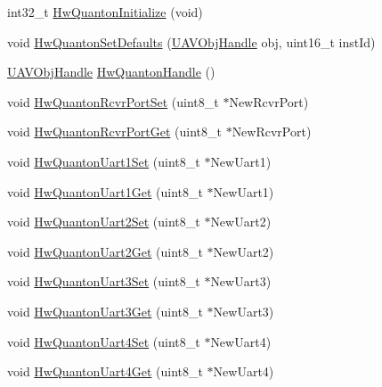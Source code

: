 \begin{DoxyCompactItemize}
\item 
int32\-\_\-t \hyperlink{group___hw_quanton_gae2df9822c9e4dc6b9ff0a0279c1b752c}{\-Hw\-Quanton\-Initialize} (void)
\item 
void \hyperlink{group___hw_quanton_ga95a69075563fcfd70b1cc3efbd8539c3}{\-Hw\-Quanton\-Set\-Defaults} (\hyperlink{targets_2_u_a_v_objects_2inc_2uavobjectmanager_8h_a279053e22be53ce9f895043aaeb91e3b}{\-U\-A\-V\-Obj\-Handle} obj, uint16\-\_\-t inst\-Id)
\item 
\hyperlink{targets_2_u_a_v_objects_2inc_2uavobjectmanager_8h_a279053e22be53ce9f895043aaeb91e3b}{\-U\-A\-V\-Obj\-Handle} \hyperlink{group___hw_quanton_ga00ae70f945e2fa2fc4e6a6668b62e39c}{\-Hw\-Quanton\-Handle} ()
\item 
void \hyperlink{group___hw_quanton_gab4fe0384660d8d039ed3e371b6895635}{\-Hw\-Quanton\-Rcvr\-Port\-Set} (uint8\-\_\-t $\ast$\-New\-Rcvr\-Port)
\item 
void \hyperlink{group___hw_quanton_gab22730ad4f488960df2bd2301b038a0e}{\-Hw\-Quanton\-Rcvr\-Port\-Get} (uint8\-\_\-t $\ast$\-New\-Rcvr\-Port)
\item 
void \hyperlink{group___hw_quanton_gafe02655e076c9d34e8db01edcd1fc32f}{\-Hw\-Quanton\-Uart1\-Set} (uint8\-\_\-t $\ast$\-New\-Uart1)
\item 
void \hyperlink{group___hw_quanton_ga3249f49fdc06c794f297320d9c01d3ef}{\-Hw\-Quanton\-Uart1\-Get} (uint8\-\_\-t $\ast$\-New\-Uart1)
\item 
void \hyperlink{group___hw_quanton_ga404b283aaa5abffea44da275f1a972fa}{\-Hw\-Quanton\-Uart2\-Set} (uint8\-\_\-t $\ast$\-New\-Uart2)
\item 
void \hyperlink{group___hw_quanton_ga1f304be0c4711110578db61655892ad3}{\-Hw\-Quanton\-Uart2\-Get} (uint8\-\_\-t $\ast$\-New\-Uart2)
\item 
void \hyperlink{group___hw_quanton_ga6767251ed13a41b6b8014554c5b31501}{\-Hw\-Quanton\-Uart3\-Set} (uint8\-\_\-t $\ast$\-New\-Uart3)
\item 
void \hyperlink{group___hw_quanton_gacb145f2a60f0a086fa1fad28690894f8}{\-Hw\-Quanton\-Uart3\-Get} (uint8\-\_\-t $\ast$\-New\-Uart3)
\item 
void \hyperlink{group___hw_quanton_ga8e36b7b78da87747aab42ace1efea523}{\-Hw\-Quanton\-Uart4\-Set} (uint8\-\_\-t $\ast$\-New\-Uart4)
\item 
void \hyperlink{group___hw_quanton_ga96cfc0b23e1f8a72b592e550a33dcf06}{\-Hw\-Quanton\-Uart4\-Get} (uint8\-\_\-t $\ast$\-New\-Uart4)
\item 

\end{DoxyCompactItemize}
